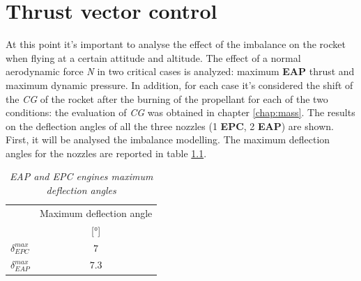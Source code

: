 \documentclass[12pt,fleqn,openany]{book} %
\begin{document}
\chapter{Thrust vector control}
At this point it’s important to analyse the effect of the imbalance on the rocket when flying at a certain attitude and altitude. The effect of a normal aerodynamic force \textit{N} in two critical cases is analyzed: maximum \textbf{EAP} thrust and maximum dynamic pressure. In addition, for each case it’s considered the shift of the \textit{CG} of the rocket after the burning of the propellant for each of the two conditions: the evaluation of \textit{CG} was obtained in chapter \hypertarget{chap:mass}{\ref{chap:mass}}. The results on the deflection angles of all the three nozzles (1 \textbf{EPC}, 2 \textbf{EAP}) are shown. First, it will be analysed the imbalance modelling. The maximum deflection angles for the nozzles are reported in table \hypertarget{tab:maxang}{\ref{tab:maxang}}. 
\begin{table}[h]
	\centering
	\begin{tabular}{ l c }
\toprule
										&Maximum deflection angle 				\\
										&[\si{\degree}]			\\
\midrule                                                                                                             
$\delta_{EPC}^{max}$						&$7$			\\
$\delta_{EAP}^{max}$						&$7.3$			\\
\bottomrule
\end{tabular} 
\caption{\emph{EAP and EPC engines maximum deflection angles}}        
\label{tab:maxang}                       
\end{table}
\end{document}
